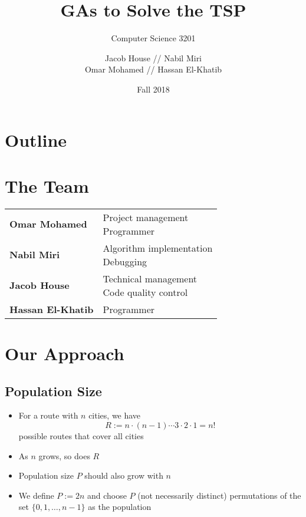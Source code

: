 \documentclass[xcolor={usenames,dvipsnames,svgnames}]{beamer}
\title{GAs to Solve the TSP}
\subtitle{Computer Science 3201}
\author{Jacob House // Nabil Miri \\ Omar Mohamed // Hassan El-Khatib}
\date{Fall 2018}
\begin{document}
\begin{frame}[plain]
\titlepage
\end{frame}

\startheads

\section*{Outline}
\begin{frame}
	\tableofcontents
\end{frame}

\section{The Team}
\begin{frame}
\def\arraystretch{2}%
\begin{tabular}{>{\color{structure}\bfseries}ll}
	Omar Mohamed & \parbox[t]{.75\linewidth}{Project management \\ Programmer} \\
	Nabil Miri & \parbox[t]{.75\linewidth}{Algorithm implementation \\ Debugging} \\
	Jacob House & \parbox[t]{.75\linewidth}{Technical management \\ Code quality control} \\
	Hassan El-Khatib & Programmer
\end{tabular}
\end{frame}

\section{Our Approach}
\subsection{Population Size}
\begin{frame}
\begin{itemize}
	\item<1-> For a route with $n$ cities, we have
	\begin{equation*}
	R := n \cdot (n-1) \cdots 3 \cdot 2 \cdot 1 = n!
	\end{equation*}
	possible routes that cover all cities
	\item<2-> As $n$ grows, so does $R$
	\item<3-> Population size $P$ should also grow with $n$
	\item<4-> We define $P := 2n$ and choose $P$ (not necessarily distinct) permutations of the set $\{0, 1, \ldots, n-1\}$ as the population
\end{itemize}
\end{frame}
\end{document}
